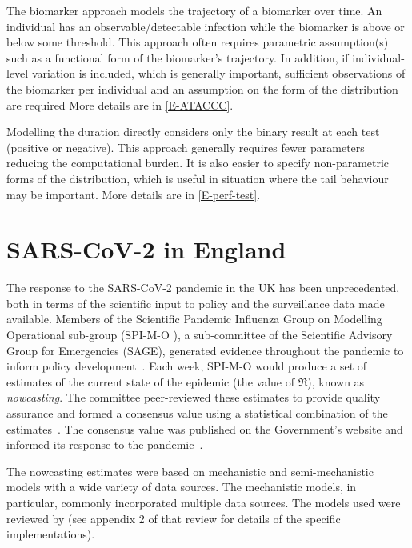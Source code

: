 \documentclass[thesis.tex]{subfiles}
\begin{document}
The biomarker approach models the trajectory of a biomarker over time.
An individual has an observable/detectable infection while the biomarker is above or below some threshold.
This approach often requires parametric assumption(s) such as a functional form of the biomarker's trajectory.
In addition, if individual-level variation is included, which is generally important,  sufficient observations of the biomarker per individual and an assumption on the form of the distribution are required
More details are in \cref{E-ATACCC}.

Modelling the duration directly considers only the binary result at each test (positive or negative).
This approach generally requires fewer parameters reducing the computational burden.
It is also easier to specify non-parametric forms of the distribution, which is useful in situation where the tail behaviour may be important.
More details are in \cref{E-perf-test}.


\section{SARS-CoV-2 in England}

The response to the SARS-CoV-2 pandemic in the UK has been unprecedented, both in terms of the scientific input to policy and the surveillance data made available. Members of the Scientific Pandemic Influenza Group on Modelling Operational sub-group (SPI-M-O ), a sub-committee of the Scientific Advisory Group for Emergencies (SAGE), generated evidence throughout the pandemic to inform policy development~\autocite{medleySPIM,govSPIMO}.
Each week, SPI-M-O would produce a set of estimates of the current state of the epidemic (\eg the value of $\Re$), known as \emph{nowcasting}.
The committee peer-reviewed these estimates to provide quality assurance and formed a consensus value using a statistical combination of the estimates~\autocite{parkCombining}.
The consensus value was published on the Government's website and informed its response to the pandemic~\autocite{govRnumber}.

The nowcasting estimates were based on mechanistic and semi-mechanistic models with a wide variety of data sources.
The mechanistic models, in  particular, commonly incorporated multiple data sources.
The models used were reviewed by \textcite{royalSocietyRnumber} (see appendix 2 of that review for details of the specific implementations).
\end{document}
